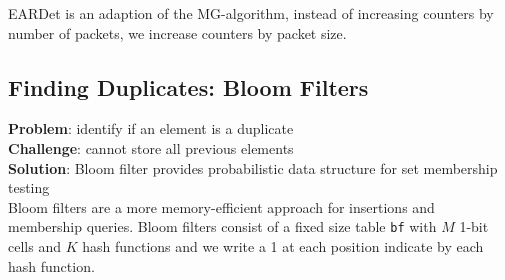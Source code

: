 \documentclass[11pt,oneside,a4paper]{article}
\begin{document}
\noindent EARDet is an adaption of the MG-algorithm, instead of increasing counters by number of packets, we increase counters by packet size.

\subsection{Finding Duplicates: Bloom Filters}

\textbf{Problem}: identify if an element is a duplicate\\
\textbf{Challenge}: cannot store all previous elements\\
\textbf{Solution}: Bloom filter provides probabilistic data structure for set membership testing\\

\noindent Bloom filters are a more memory-efficient approach for insertions and membership queries. Bloom filters consist of a fixed size table \texttt{bf} with $M$ 1-bit cells and $K$ hash functions and we write a 1 at each position indicate by each hash function.
\end{document}
